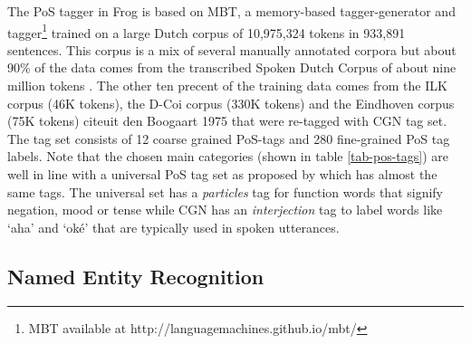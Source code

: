 \documentclass{book}
\begin{document}
The PoS tagger in Frog is based on MBT, a memory-based tagger-generator and tagger\footnote{MBT available at http://languagemachines.github.io/mbt/}\cite{mbt} trained on a large Dutch corpus of 10,975,324 tokens in 933,891 sentences. This corpus is a mix of several manually annotated corpora but about 90\% of the data comes from the transcribed Spoken Dutch Corpus of about nine million tokens \cite{CGN2003}. The other ten precent of the training data comes from the ILK corpus (46K tokens), the D-Coi corpus (330K tokens) and the Eindhoven corpus (75K tokens) cite{uit den Boogaart 1975} that were re-tagged with CGN tag set.
The tag set consists of 12 coarse grained PoS-tags and 280 fine-grained PoS tag labels. Note that the chosen main categories (shown in table \ref{tab-pos-tags}) are well in line with a universal PoS tag set as proposed by  which has almost the same tags. The universal set has a {\it particles} tag for function words that signify negation, mood or tense while CGN has an  {\it interjection} tag to label words like `aha' and `ok\'e'  that are typically used in spoken utterances.


\subsection{Named Entity Recognition}\label{sec-bg-ner}
\end{document}
